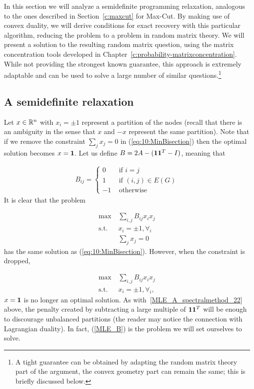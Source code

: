 In this section we will analyze a semidefinite programming relaxation, analogous to the ones described in Section~\ref{c:maxcut} for Max-Cut. By making use of convex duality, we will derive conditions for exact recovery with this particular algorithm, reducing the problem to a problem in random matrix theory. We will present a solution to the resulting random matrix question, using the matrix concentration tools developed in Chapter~\ref{c:probability-matrixconcentration}. While not providing the strongest known guarantee, this approach is extremely adaptable and can be used to solve a large number of similar questions.\footnote{A tight guarantee can be obtained by adapting the random matrix theory part of the argument, the convex geometry part can remain the same; this is briefly discussed below.}





\subsection{A semidefinite relaxation}

Let $x\in\mathbb{R}^n$ with $x_i =\pm 1$ represent a partition of the nodes (recall that there is an ambiguity in the sense that $x$ and $-x$ represent the same partition).
Note that if we remove the constraint $\sum_j x_j = 0$ in (\ref{eq:10:MinBisection}) then the optimal solution becomes $x=\mathbf{1}$. Let us define $B = 2A - (\mathbf{1}\mathbf{1}^T -I)$, meaning that

\begin{align}
B_{ij} = \left\{ \begin{array}{rl} 0 & \text{ if } i=j \\ 1 & \text{ if } (i,j)\in E(G) \\ -1 & \text{ otherwise} \end{array}  \right.
\end{align}
It is clear that the problem

\begin{align}
\max\ & \sum_{i,j}B_{ij}x_ix_j \nonumber\\
\text{s.t.}\ &x_i=\pm1, \forall_i \label{MLE_B_old}\\
 & \sum_j x_j = 0 \nonumber
\end{align}
has the same solution as (\ref{eq:10:MinBisection}). However, when the constraint is dropped,

\begin{align}
\max\ & \sum_{i,j}B_{ij}x_ix_j \nonumber\\
\text{s.t.}\ &x_i=\pm1, \forall_i \label{MLE_B},
\end{align}
$x= \mathbf{1}$ is no longer an optimal solution. As with~\eqref{MLE_A_spectralmethod_22} above, the penalty created by subtracting a large multiple of $\mathbf{1}\mathbf{1}^T$ will be enough to discourage unbalanced partitions (the reader may notice the connection with Lagrangian duality). In fact, (\ref{MLE_B}) is the problem we will set ourselves to solve.

